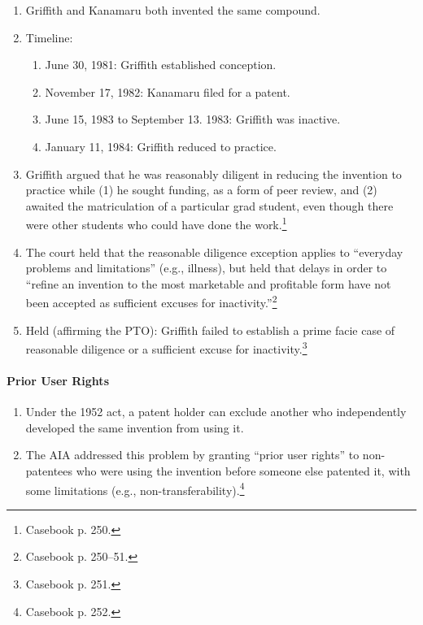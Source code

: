 \begin{enumerate}
    \item Griffith and Kanamaru both invented the same compound.
    \item Timeline:
    \begin{enumerate}
        \item June 30, 1981: Griffith established conception.
        \item November 17, 1982: Kanamaru filed for a patent.
        \item June 15, 1983 to September 13. 1983: Griffith was inactive.
        \item January 11, 1984: Griffith reduced to practice.
    \end{enumerate}
    \item Griffith argued that he was reasonably diligent in reducing the 
    invention to practice while (1) he sought funding, as a form of peer review, 
    and (2) awaited the matriculation of a particular grad student, even though 
    there were other students who could have done the work.\footnote{Casebook p. 
    250.}
    \item The court held that the reasonable diligence exception applies to 
    ``everyday problems and limitations'' (e.g., illness), but held that delays 
    in order to ``refine an invention to the most marketable and profitable form 
    have not been accepted as sufficient excuses for 
    inactivity.''\footnote{Casebook p. 250--51.}
    \item Held (affirming the PTO): Griffith failed to establish a prime facie 
    case of reasonable diligence or a sufficient excuse for 
    inactivity.\footnote{Casebook p. 251.}
\end{enumerate}

\paragraph{Prior User Rights}

\begin{enumerate}
    \item Under the 1952 act, a patent holder can exclude another who 
    independently developed the same invention from using it.
    \item The AIA addressed this problem by granting ``prior user rights'' to 
    non-patentees who were using the invention before someone else patented it, 
    with some limitations (e.g., non-transferability).\footnote{Casebook p. 252.}
\end{enumerate}

